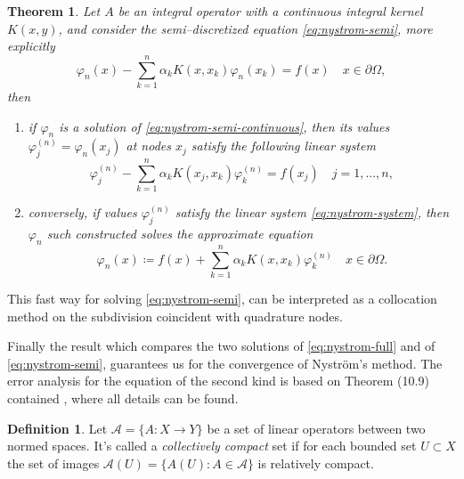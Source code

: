 \documentclass[10pt, a4paper, twoside, openright]{book}
\theoremstyle{definition}
\newtheorem{definition}[subsection]{Definition}
\theoremstyle{plain}
\newtheorem{theorem}[subsection]{Theorem}
\theoremstyle{plain}
\theoremstyle{plain}
\theoremstyle{plain}
\theoremstyle{plain}
\theoremstyle{plain}
\theoremstyle{plain}
\theoremstyle{plain}
\let\phi\varphi
\begin{document}
\begin{theorem}
 Let $A$ be an integral operator with a continuous integral kernel $K(x,y)$, 
 and consider the semi--discretized equation \eqref{eq:nystrom-semi}, more explicitly
 \begin{equation}
  \label{eq:nystrom-semi-continuous}
  \phi_n(x) -\sum_{k=1}^n\alpha_k K(x,x_k)\phi_n(x_k)=f(x) \quad x\in \partial \Omega,
 \end{equation}
 then
 \begin{enumerate}
  \item if $\phi_n$ is a solution of \eqref{eq:nystrom-semi-continuous}, then its values $\phi_j^{(n)} = \phi_n(x_j)$ 
  at nodes $x_j$ satisfy the following linear system
  \begin{equation}
    \label{eq:nystrom-system}
    \phi_j^{(n)} - \sum_{k=1}^n\alpha_k K(x_j,x_k)\phi_k^{(n)} = f(x_j)\quad j=1,...,n,
  \end{equation}
  \item conversely, if values $\phi_j^{(n)}$ satisfy the linear system \eqref{eq:nystrom-system}, then $\phi_n$ such constructed solves the approximate equation
  \begin{equation}
   \phi_n(x)\coloneqq f(x) + \sum_{k=1}^n\alpha_k K(x,x_k)\phi_k^{(n)} \quad x\in \partial\Omega.
  \end{equation}
 \end{enumerate}
\end{theorem}
This fast way for solving \eqref{eq:nystrom-semi}, can be interpreted as a collocation method on the subdivision coincident with quadrature nodes.
\par
Finally the result which compares the two solutions of \eqref{eq:nystrom-full} and of 
\eqref{eq:nystrom-semi}, guarantees us for the convergence of Nystr\"om's method.
The error analysis for the equation of the second kind is based on Theorem (10.9) contained \cite{kress:book}, where all details can be found.
\begin{definition}
\label{def:collectively-compact}
 Let $\mathcal{A}=\{A:X\to Y\}$ be a set of linear operators between two normed spaces. It's called a \emph{collectively compact} set if for each bounded set $U\subset X$ the set of images $\mathcal{A}(U)=\{A(U):A\in\mathcal{A}\}$ is relatively compact.
\end{definition}
\end{document}
